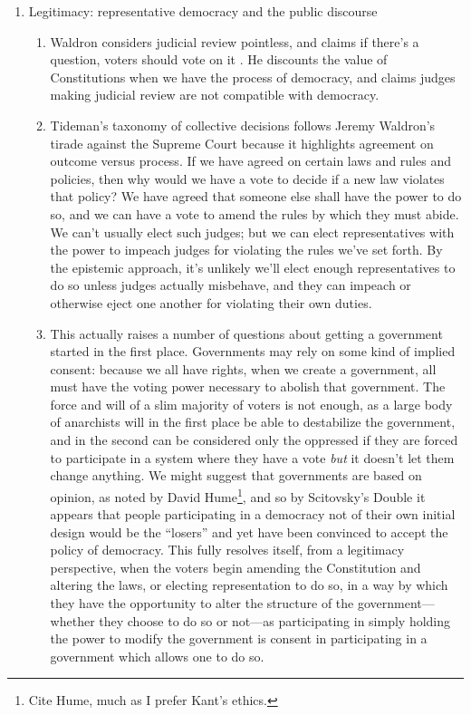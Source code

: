 \begin{enumerate}
    \item Legitimacy:  representative democracy and the public discourse
    \begin{enumerate}
        \item \philosophical Waldron considers judicial review pointless, and claims if there's a question, voters should vote on it \autocite{Waldron1998}.  He discounts the value of Constitutions when we have the process of democracy, and claims judges making judicial review are not compatible with democracy.

        \item \technical Tideman's taxonomy of collective decisions \autocite{Tideman2006} follows Jeremy Waldron's tirade against the Supreme Court because it highlights agreement on outcome versus process.  If we have agreed on certain laws and rules and policies, then why would we have a vote to decide if a new law violates that policy?  We have agreed that someone else shall have the power to do so, and we can have a vote to amend the rules by which they must abide.  We can't usually elect such judges; but we can elect representatives with the power to impeach judges for violating the rules we've set forth.  By the epistemic approach, it's unlikely we'll elect enough representatives to do so unless judges actually misbehave, and they can impeach or otherwise eject one another for violating their own duties.

        \item \philosophical This actually raises a number of questions about getting a government started in the first place.  Governments may rely on some kind of implied consent:  because we all have rights, when we create a government, all must have the voting power necessary to abolish that government.  The force and will of a slim majority of voters is not enough, as a large body of anarchists will in the first place be able to destabilize the government, and in the second can be considered only the oppressed if they are forced to participate in a system where they have a vote \textit{but} it doesn't let them change anything.  We might suggest that governments are based on opinion, as noted by David Hume\footnote{Cite Hume, much as I prefer Kant's ethics.}, and so by Scitovsky's Double it appears that people participating in a democracy not of their own initial design would be the ``losers'' and yet have been convinced to accept the policy of democracy.  This fully resolves itself, from a legitimacy perspective, when the voters begin amending the Constitution and altering the laws, or electing representation to do so, in a way by which they have the opportunity to alter the structure of the government—whether they choose to do so or not—as participating in simply holding the power to modify the government is consent in participating in a government which allows one to do so.


\end{enumerate}
\end{enumerate}
